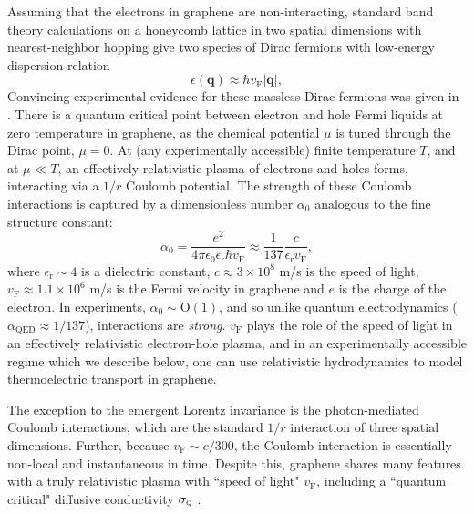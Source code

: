 Assuming that the electrons in graphene are non-interacting, standard band theory calculations on a honeycomb lattice in two spatial dimensions with nearest-neighbor hopping give two species of Dirac fermions with low-energy dispersion relation
\begin{equation}
\epsilon(\mathbf{q}) \approx \hbar v_{\mathrm{F}} |\mathbf{q}|,  \label{eq:AL_eq1}
\end{equation}
Convincing experimental evidence for these massless Dirac fermions was given in \cite{novoselov_two-dimensional_2005, zhang_experimental_2005}.  There is a quantum critical point between electron and hole Fermi liquids at zero temperature in graphene, as the chemical potential $\mu$ is tuned through the Dirac point,  $\mu=0$.   At (any experimentally accessible) finite temperature $T$, and at $\mu \ll T$, an effectively relativistic plasma of electrons and holes forms, interacting via a $1/r$ Coulomb potential.    The strength of these Coulomb interactions is captured by a dimensionless number $\alpha_0$ analogous to the fine structure constant: \begin{equation}
\alpha_0 = \frac{e^2}{4\pi \epsilon_0 \epsilon_{\mathrm{r}} \hbar v_{\mathrm{F}}} \approx \frac{1}{137} \frac{c}{\epsilon_{\mathrm{r}} v_{\mathrm{F}}},
\end{equation}
where $\epsilon_{\mathrm{r}} \sim 4$ is a dielectric constant,  $c \approx 3\times 10^8$ m/s is the speed of light,  $v_{\mathrm{F}} \approx 1.1 \times 10^6$ m/s is the Fermi velocity in graphene and $e$ is the charge of the electron.    In experiments, $\alpha_0 \sim \mathrm{O}(1)$, and so unlike quantum electrodynamics ($\alpha_{\mathrm{QED}} \approx 1/137$),  interactions are \emph{strong}.  $v_{\mathrm{F}}$ plays the role of the speed of light in an effectively relativistic electron-hole plasma, and in an experimentally accessible regime which we describe below,  one can use relativistic hydrodynamics to model thermoelectric transport in graphene.   

The exception to the emergent Lorentz invariance is the photon-mediated Coulomb interactions, which are the standard $1/r$ interaction of three spatial dimensions.   Further, because $v_{\mathrm{F}} \sim c/300$,  the Coulomb interaction is essentially non-local and instantaneous in time.   Despite this,  graphene shares many features with a truly relativistic plasma with ``speed of light" $v_{\mathrm{F}}$, including a ``quantum critical" diffusive conductivity $\sigma_{\textsc{q}}$ \cite{muller_quantum-critical_2008}.

